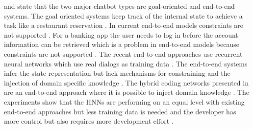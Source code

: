 \documentclass[12pt, backref]{report}
\begin{document}
\citet{williams2017hybrid} and \citet{bordes2016learning} state that the two major chatbot types are goal-oriented and end-to-end systems.
The goal oriented systems keep track of the internal state to achieve a task like a restaurant reservation \cite{williams2017hybrid}. 
In current end-to-end models constraints are not supported \cite{williams2017hybrid}. For a banking app the user needs to log in before the account information can be retrieved which is a problem in end-to-end models because constraints are not supported \cite{williams2017hybrid}.
The recent end-to-end approaches use recurrent neural networks which use real dialogs as training data \cite{williams2017hybrid}. The end-to-end systems infer the state representation but lack mechanisms for constraining and the injection of domain specific knowledge \cite{williams2017hybrid}.
The hybrid coding networks presented in \citet{williams2017hybrid} are an end-to-end approach where it is possible to inject domain knowledge \cite{williams2017hybrid}. The experiments show that the HNNs are performing on an equal level with existing end-to-end approaches but less training data is needed and the developer has more control but also requires more development effort \cite{williams2017hybrid}.
\end{document}
